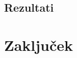 \documentclass[11pt,a4paper,openany]{book}
\begin{document}
\section{Rezultati}




\chapter*{Zaključek}




\end{document}
